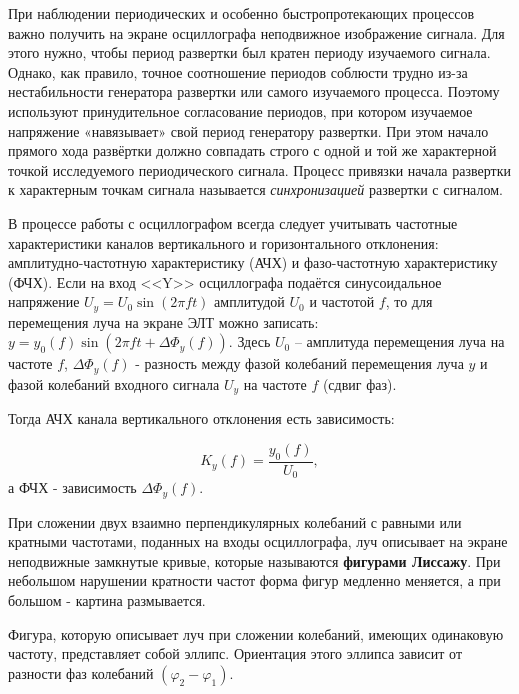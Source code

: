 \documentclass[a4paper,12pt]{article} %
\begin{document}
	При наблюдении периодических и особенно быстропротекающих процессов важно получить на экране осциллографа неподвижное изображение сигнала. 
	Для этого нужно, чтобы период развертки был кратен периоду изучаемого сигнала. Однако, как правило, точное соотношение периодов соблюсти трудно из-за нестабильности генератора развертки или самого изучаемого процесса.
	Поэтому используют принудительное согласование периодов, при котором изучаемое напряжение «навязывает» свой период генератору развертки. При этом начало прямого хода развёртки должно совпадать строго с одной и той же характерной точкой исследуемого периодического сигнала. 
	Процесс привязки начала развертки к характерным точкам сигнала называется \textit{синхронизацией} развертки с сигналом.
	
	В процессе работы с осциллографом всегда следует учитывать частотные характеристики каналов вертикального и горизонтального отклонения: амплитудно-частотную характеристику (АЧХ) и фазо-­частотную характеристику (ФЧХ). Если на вход <<Y>> осциллографа подаётся синусоидальное напряжение $ U_y=U_0\sin\left(2\pi ft\right) $ амплитудой $ U_0 $ и частотой $ f $, то для перемещения луча на экране ЭЛТ можно записать: $ y=y_0\left(f\right)\sin\left(2\pi ft + \Delta\Phi_y\left(f\right)\right) $. Здесь $ U_0 $ -- амплитуда перемещения луча на частоте $ f $, $ \Delta\Phi_y\left(f\right) $ - разность между фазой колебаний перемещения луча $ y $ и фазой колебаний входного сигнала $ U_y $ на частоте $ f $ (сдвиг фаз).
	
	Тогда АЧХ канала вертикального отклонения есть зависимость:
	
	\begin{equation}
		K_y\left(f\right) = \frac{y_0\left(f\right)}{U_0}, \label{ahch}
	\end{equation}
	а ФЧХ - зависимость $ \Delta\Phi_y\left(f\right) $.
	
	При сложении двух взаимно перпендикулярных колебаний с равными или кратными частотами, поданных на входы осциллографа, луч описывает на экране неподвижные замкнутые кривые, которые называются \textbf{фигурами Лиссажу}. При небольшом нарушении кратности частот форма фигур медленно меняется, а при большом - картина размывается.
	
	Фигура, которую описывает луч при сложении колебаний, имеющих одинаковую частоту, представляет собой эллипс. Ориентация этого эллипса зависит от разности фаз колебаний $ \left(\varphi_2-\varphi_1\right) $.
	
\end{document}
